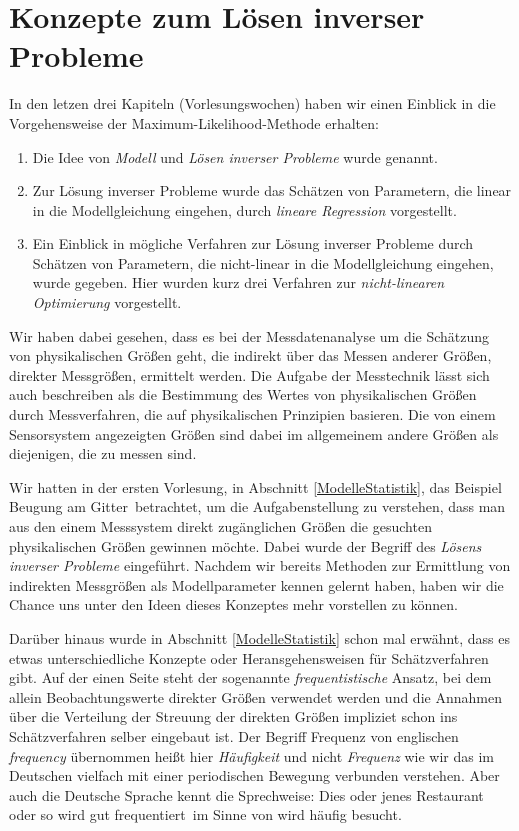 
\section{Konzepte zum Lösen inverser Probleme}

In den letzen drei Kapiteln (Vorlesungswochen) haben wir einen Einblick in die
Vorgehensweise der Maximum-Likelihood-Methode erhalten:
\begin{enumerate}
\item Die Idee von \textsl{Modell} und \textsl{Lösen inverser Probleme} wurde
  genannt.
\item Zur Lösung inverser Probleme wurde das Schätzen von Parametern, die
 linear in die Modellgleichung eingehen, durch \textsl{lineare Regression} vorgestellt.
\item Ein Einblick in mögliche Verfahren zur Lösung inverser Probleme durch
  Schätzen von Parametern, die nicht-linear in die Modellgleichung eingehen,
  wurde gegeben. Hier wurden kurz drei Verfahren zur \textsl{nicht-linearen Optimierung}
  vorgestellt.
\end{enumerate}
Wir haben dabei gesehen, dass es bei der Messdatenanalyse um die Schätzung von
physikalischen Größen geht, die indirekt über das Messen anderer Größen,
direkter Messgrößen, ermittelt werden.
Die Aufgabe der Messtechnik lässt sich auch beschreiben als die Bestimmung
des Wertes von physikalischen Größen durch Messverfahren, die auf
physikalischen Prinzipien basieren. Die von einem Sensorsystem angezeigten
Größen sind dabei im allgemeinem andere Größen als diejenigen, die zu messen sind.

Wir hatten in der ersten Vorlesung, in Abschnitt \ref{ModelleStatistik},
das Beispiel \glqq Beugung am Gitter\grqq ~betrachtet, 
um die Aufgabenstellung zu verstehen, dass man
aus den einem Messsystem direkt zugänglichen Größen die gesuchten physikalischen
Größen gewinnen möchte. Dabei wurde der Begriff des \textsl{Lösens inverser Probleme}
eingeführt. Nachdem wir bereits Methoden zur Ermittlung von indirekten
Messgrößen als Modellparameter kennen gelernt haben, haben wir die Chance uns
unter den Ideen dieses Konzeptes mehr vorstellen zu können.

Darüber hinaus wurde in Abschnitt \ref{ModelleStatistik} schon mal erwähnt, dass
es etwas unterschiedliche Konzepte oder Heransgehensweisen für Schätzverfahren gibt.
Auf der einen Seite steht der sogenannte \textsl{frequentistische} Ansatz, bei dem allein
Beobachtungswerte direkter Größen verwendet werden und die Annahmen über die
Verteilung der Streuung der direkten Größen impliziet schon ins Schätzverfahren
selber eingebaut ist. Der Begriff Frequenz von englischen \textsl{frequency} übernommen
heißt hier \textsl{Häufigkeit} und nicht \textsl{Frequenz} wie wir das im Deutschen
vielfach mit einer periodischen Bewegung verbunden verstehen. Aber auch die
Deutsche Sprache kennt die Sprechweise: \glqq Dies oder jenes Restaurant oder so
wird gut frequentiert\grqq ~im Sinne von \glqq wird häufig besucht\grqq.

